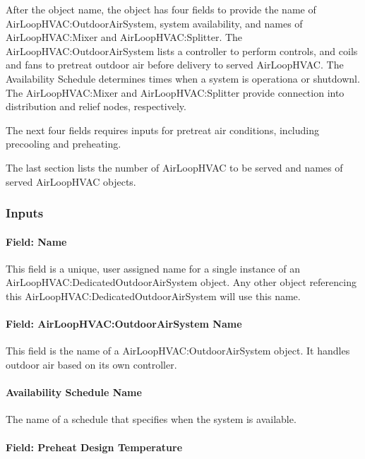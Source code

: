 After the object name, the object has four fields to provide the name of AirLoopHVAC:OutdoorAirSystem, system availability, and names of AirLoopHVAC:Mixer and AirLoopHVAC:Splitter. The AirLoopHVAC:OutdoorAirSystem lists a controller to perform controls, and coils and fans to pretreat outdoor air before delivery to served AirLoopHVAC. The Availability Schedule determines times when a system is operationa or shutdownl. The AirLoopHVAC:Mixer and AirLoopHVAC:Splitter provide connection into distribution and relief nodes, respectively.

The next four fields requires inputs for pretreat air conditions, including precooling and preheating.

The last section lists the number of AirLoopHVAC to be served and names of served AirLoopHVAC objects.

\subsubsection{Inputs}\label{inputs-002}

\paragraph{Field: Name}\label{field-name-002}

This field is a unique, user assigned name for a single instance of an AirLoopHVAC:DedicatedOutdoorAirSystem object. Any other object referencing this AirLoopHVAC:DedicatedOutdoorAirSystem will use this name.

\paragraph{Field: AirLoopHVAC:OutdoorAirSystem Name}\label{field-airLoophvac-outdoorairsystem-name}

This field is the name of a AirLoopHVAC:OutdoorAirSystem object. It handles outdoor air based on its own controller.

\paragraph{Availability Schedule Name}\label{availability-schedule-name}

The name of a schedule that specifies when the system is available.

\paragraph{Field: Preheat Design Temperature}\label{field-preheat-design-temperature}

